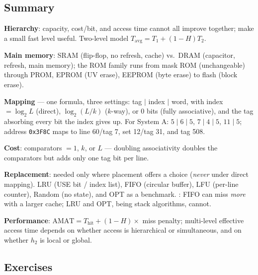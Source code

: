 \documentclass[11pt]{article}
\begin{document}
\subsection{Summary}

\textbf{Hierarchy}: capacity, cost/bit, and access time cannot all improve together;  make a small fast level useful. Two-level model $T_{\text{avg}} = T_1 + (1-H)T_2$.

\textbf{Main memory}: SRAM (flip-flop, no refresh, cache) vs.\ DRAM (capacitor, refresh, main memory); the ROM family runs from mask ROM (unchangeable) through PROM, EPROM (UV erase), EEPROM (byte erase) to flash (block erase).

\textbf{Mapping} --- one formula, three settings: tag $\mid$ index $\mid$ word, with index $= \log_2 L$ (direct), $\log_2(L/k)$ ($k$-way), or 0 bits (fully associative), and the tag absorbing every bit the index gives up. For System A: $5\mid6\mid5$, $7\mid4\mid5$, $11\mid5$; address \texttt{0x3F8C} maps to line 60/tag 7, set 12/tag 31, and tag 508.

\textbf{Cost}: comparators $= 1$, $k$, or $L$ --- doubling associativity doubles the comparators but adds only one tag bit per line.

\textbf{Replacement}: needed only where placement offers a choice (\emph{never} under direct mapping). LRU (USE bit / index list), FIFO (circular buffer), LFU (per-line counter), Random (no state), and OPT as a benchmark. : FIFO can miss \emph{more} with a larger cache; LRU and OPT, being stack algorithms, cannot.

\textbf{Performance}: $\text{AMAT} = T_{\text{hit}} + (1-H)\times$ miss penalty; multi-level effective access time depends on whether access is hierarchical or simultaneous, and on whether $h_2$ is local or global.

\subsection*{Exercises}
\end{document}
